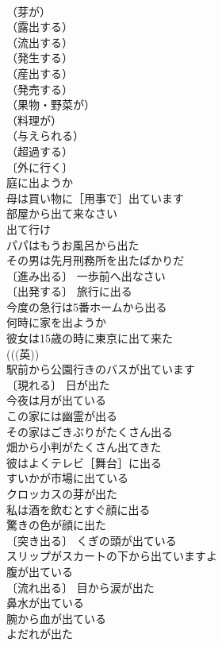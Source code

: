 \documentclass[8pt]{extreport}
\begin{document}
\begin{CJK}{UTF8}{min}
\\	（芽が）
\\	（露出する）
\\	（流出する）
\\	（発生する）
\\	（産出する）
\\	（発売する）
\\	（果物・野菜が）
\\	（料理が）
\\	（与えられる）
\\	（超過する）
\\	〔外に行く〕
\\	庭に出ようか 
\\	母は買い物に［用事で］出ています 
\\	部屋から出て来なさい 
\\	出て行け 
\\	パパはもうお風呂から出た 
\\	その男は先月刑務所を出たばかりだ 
\\	〔進み出る〕 一歩前へ出なさい 
\\	〔出発する〕 旅行に出る 
\\	今度の急行は5番ホームから出る 
\\	何時に家を出ようか 
\\	彼女は15歳の時に東京に出て来た 
\\	(((英))
\\	駅前から公園行きのバスが出ています 
\\	〔現れる〕 日が出た 
\\	今夜は月が出ている 
\\	この家には幽霊が出る 
\\	その家はごきぶりがたくさん出る 
\\	畑から小判がたくさん出てきた 
\\	彼はよくテレビ［舞台］に出る 
\\	すいかが市場に出ている 
\\	クロッカスの芽が出た 
\\	私は酒を飲むとすぐ顔に出る 
\\	驚きの色が顔に出た 
\\	〔突き出る〕 くぎの頭が出ている 
\\	スリップがスカートの下から出ていますよ 
\\	腹が出ている 
\\	〔流れ出る〕 目から涙が出た 
\\	鼻水が出ている 
\\	腕から血が出ている 
\\	よだれが出た 

\end{CJK}
\end{document}
